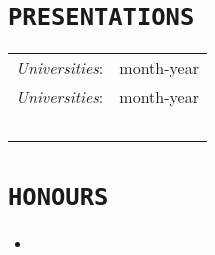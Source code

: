 \documentclass{cls/Curriculum_Vitae_Class}
\begin{document}
\section{\texttt{PRESENTATIONS}}
\begin{tabular}{ l l }
 \textit{Universities}: &  \hfill month-year \\ [0.5em]
 \textit{Universities}: & \hfill month-year \\~\\
\end{tabular}


\section{\texttt{HONOURS}}
\begin{itemize}
	\item {}\\~\\
\end{itemize}


\end{document}
